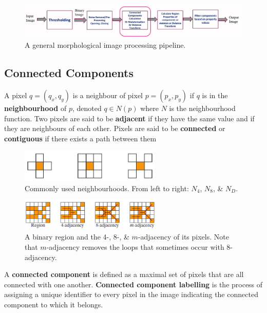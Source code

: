 \documentclass[a4paper,11pt]{article}
\begin{document}
\begin{figure}[H]
    \centering
    \includegraphics[width=\textwidth]{images/morphimagepipeline.png}
    \caption{ A general morphological image processing pipeline. }
\end{figure}

\subsection{Connected Components}
A pixel $q = (q_x, q_y)$ is a neighbour of pixel $p = (p_x, p_y)$ if $q$ is in the \textbf{neighbourhood} of $p$, denoted $q \in N(p)$ where $N$ is the neighbourhood function.
Two pixels are said to be \textbf{adjacent} if they have the same value and if they are neighbours of each other.
Pixels are said to be \textbf{connected} or \textbf{contiguous} if there exists a path between them

\begin{figure}[H]
    \centering
    \includegraphics[width=0.6\textwidth]{images/commonneighbourhoods.png}
    \caption{Commonly used neighbourhoods. From left to right: $N_4$, $N_8$, \& $N_D$.}
\end{figure}

\begin{figure}[H]
    \centering
    \includegraphics[width=0.6\textwidth]{images/binaryregioncommonneighbourhoods.png}
    \caption{A binary region and the 4-, 8-, \& $m$-adjacency of its pixels. Note that $m$-adjacency removes the loops that sometimes occur with 8-adjacency.}
\end{figure}

A \textbf{connected component} is defined as a maximal set of pixels that are all connected with one another.
\textbf{Connected component labelling} is the process of assigning a unique identifier to every pixel in the image indicating the connected component to which it belongs.
\end{document}
